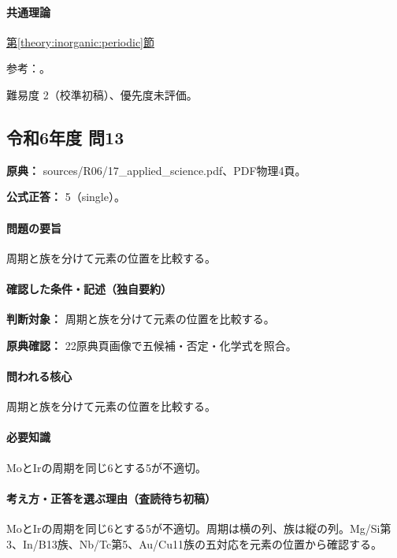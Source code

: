 \paragraph{共通理論} \hyperref[theory:inorganic:periodic]{第\ref*{theory:inorganic:periodic}節}

\par 参考：\cite{atomic_nist2019}。

\par 難易度 2（校準初稿）、優先度未評価。

\subsection{令和6年度 問13}
\label{q:r06-reg-applied-13}

\noindent\textbf{原典：} sources/R06/17\_applied\_science.pdf、PDF物理4頁。

\textbf{公式正答：} 5（single）。

\paragraph{問題の要旨} 周期と族を分けて元素の位置を比較する。

\paragraph{確認した条件・記述（独自要約）}\mbox{}\par

\noindent\textbf{判断対象：} 周期と族を分けて元素の位置を比較する。\par

\noindent\textbf{原典確認：} 22原典頁画像で五候補・否定・化学式を照合。\par

\paragraph{問われる核心} 周期と族を分けて元素の位置を比較する。

\paragraph{必要知識} MoとIrの周期を同じ6とする5が不適切。

\paragraph{考え方・正答を選ぶ理由（査読待ち初稿）} MoとIrの周期を同じ6とする5が不適切。周期は横の列、族は縦の列。Mg/Si第3、In/B13族、Nb/Tc第5、Au/Cu11族の五対応を元素の位置から確認する。

